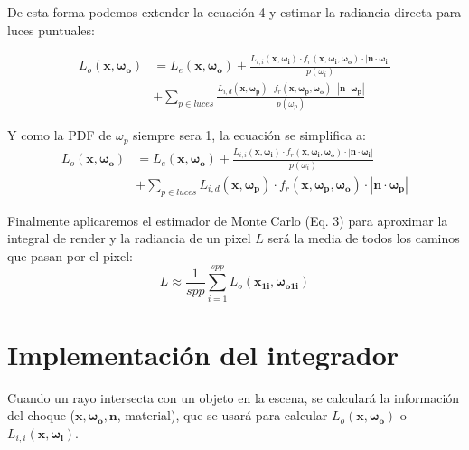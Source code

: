 \documentclass{article}
\begin{document}
De esta forma podemos extender la ecuación 4 y estimar la radiancia directa para
luces puntuales:

\begin{equation}
  \begin{split}
    L_o(\mathbf{x}, \mathbf{\omega_{o}}) & = L_e(\mathbf{x}, \mathbf{\omega_{o}}) + \frac{L_{i,i}(\mathbf{x}, \mathbf{\omega_{i}}) \cdot f_r(\mathbf{x}, \mathbf{\omega_{i}}, \mathbf{\omega_{o}}) \cdot  |\mathbf{n} \cdot \mathbf{\omega_{i}}|}{p(\omega_{i})} \\
                                         & + \sum_{p \in luces} \frac{L_{i,d}(\mathbf{x}, \mathbf{\omega_{p}}) \cdot f_r(\mathbf{x}, \mathbf{\omega_{p}}, \mathbf{\omega_{o}}) \cdot  |\mathbf{n} \cdot \mathbf{\omega_{p}}|}{p(\omega_{p})}
  \end{split}
\end{equation}

Y como la PDF de \(\omega_{p}\) siempre sera 1, la ecuación se simplifica a:
\begin{equation}
  \begin{split}
    L_o(\mathbf{x}, \mathbf{\omega_{o}}) & = L_e(\mathbf{x}, \mathbf{\omega_{o}}) + \frac{L_{i,i}(\mathbf{x}, \mathbf{\omega_{i}}) \cdot f_r(\mathbf{x}, \mathbf{\omega_{i}}, \mathbf{\omega_{o}}) \cdot  |\mathbf{n} \cdot \mathbf{\omega_{i}}|}{p(\omega_{i})} \\
                                         & + \sum_{p \in luces} L_{i,d}(\mathbf{x}, \mathbf{\omega_{p}}) \cdot f_r(\mathbf{x}, \mathbf{\omega_{p}}, \mathbf{\omega_{o}}) \cdot  |\mathbf{n} \cdot \mathbf{\omega_{p}}|
  \end{split}
\end{equation}

Finalmente aplicaremos el estimador de Monte Carlo (Eq. 3) para aproximar la
integral de render y la radiancia de un pixel \(L\) será la media de todos los
caminos que pasan por el pixel:
\begin{equation}
  L \approx \frac{1}{spp} \sum_{i=1}^{spp} L_{o}(\mathbf{x_{1i}}, \mathbf{\omega_{o1i}})
\end{equation}

\section{Implementación del integrador}
Cuando un rayo intersecta con un objeto en la escena, se calculará la
información del choque (\(\mathbf{x}, \mathbf{\omega_{o}}, \mathbf{n}\),
material), que se usará para calcular \(L_o(\mathbf{x}, \mathbf{\omega_{o}})\) o
\(L_{i,i}(\mathbf{x}, \mathbf{\omega_{i}}) \).
\end{document}
